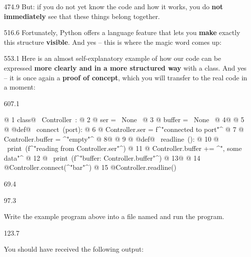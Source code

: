 \documentclass{aslab}
\newcommand*\codeix{\fontsize{9bp}{12bp}\ttfamily\lineskiplimit=-\maxdimen}
\begin{document}
\begin{region}[pitch=14.2]{474.9}
But: if you do not yet know the code and how it works, you do \textbf{not
immediately} see that these things belong together.
\end{region}

\begin{region}[pitch=13.6]{516.6}
Fortunately, Python offers a language feature that lets you \textbf{make}
exactly this structure \textbf{visible}. And yes -- this is where the magic
word comes up: 
\end{region}

\begin{region}[pitch=13.8]{553.1}
Here is an almost self-explanatory example of how our code can be expressed
\textbf{more clearly and in a more structured way} with a class. And yes --
it is once again a \textbf{proof of concept}, which you will transfer to the
real code in a moment:
\end{region}

\begin{region}[pitch=12]{607.1}
\begin{codeblock}[style=py,basicstyle=\codeix]
@  1 class@ ~Controller~:
@  2 @    ser = ~None~
@  3 @    buffer = ~None~
@  4@
@  5 @    @def@ ~connect~(port):
@  6 @        Controller.ser = f^"connected to {port}"^
@  7 @        Controller.buffer = ^"empty"^
@  8@
@  9 @    @def@ ~readline~():
@ 10 @        ~print~(f^"reading from {Controller.ser}"^)
@ 11 @        Controller.buffer += ^", some data"^
@ 12 @        ~print~(f^"buffer: {Controller.buffer}"^)
@ 13@
@ 14 @Controller.connect(^"bar"^)
@ 15 @Controller.readline()
\end{codeblock}
\end{region}

\nextpage
\begin{region}{69.4}
\end{region}

\begin{region}[pitch=13.2]{97.3}
\begin{ptasks}
\item Write the example program above into a file named
   and run the program.
\end{ptasks}
\end{region}

\begin{region}{123.7}
\begin{ptasks}[start=2]
\item You should have received the following output:
\end{ptasks}
\end{region}
\end{document}
